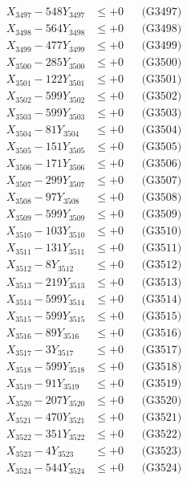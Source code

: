 \documentclass[a4paper,10pt]{article}
\begin{document}
{\begin{align}
X_{3497} - 548Y_{3497} &\leq +0 && \text{(G3497)} \\
X_{3498} - 564Y_{3498} &\leq +0 && \text{(G3498)} \\
X_{3499} - 477Y_{3499} &\leq +0 && \text{(G3499)} \\
X_{3500} - 285Y_{3500} &\leq +0 && \text{(G3500)} \\
\allowbreak
X_{3501} - 122Y_{3501} &\leq +0 && \text{(G3501)} \\
X_{3502} - 599Y_{3502} &\leq +0 && \text{(G3502)} \\
X_{3503} - 599Y_{3503} &\leq +0 && \text{(G3503)} \\
X_{3504} - 81Y_{3504} &\leq +0 && \text{(G3504)} \\
X_{3505} - 151Y_{3505} &\leq +0 && \text{(G3505)} \\
X_{3506} - 171Y_{3506} &\leq +0 && \text{(G3506)} \\
X_{3507} - 299Y_{3507} &\leq +0 && \text{(G3507)} \\
X_{3508} - 97Y_{3508} &\leq +0 && \text{(G3508)} \\
X_{3509} - 599Y_{3509} &\leq +0 && \text{(G3509)} \\
X_{3510} - 103Y_{3510} &\leq +0 && \text{(G3510)} \\
\allowbreak
X_{3511} - 131Y_{3511} &\leq +0 && \text{(G3511)} \\
X_{3512} - 8Y_{3512} &\leq +0 && \text{(G3512)} \\
X_{3513} - 219Y_{3513} &\leq +0 && \text{(G3513)} \\
X_{3514} - 599Y_{3514} &\leq +0 && \text{(G3514)} \\
X_{3515} - 599Y_{3515} &\leq +0 && \text{(G3515)} \\
X_{3516} - 89Y_{3516} &\leq +0 && \text{(G3516)} \\
X_{3517} - 3Y_{3517} &\leq +0 && \text{(G3517)} \\
X_{3518} - 599Y_{3518} &\leq +0 && \text{(G3518)} \\
X_{3519} - 91Y_{3519} &\leq +0 && \text{(G3519)} \\
X_{3520} - 207Y_{3520} &\leq +0 && \text{(G3520)} \\
\allowbreak
X_{3521} - 470Y_{3521} &\leq +0 && \text{(G3521)} \\
X_{3522} - 351Y_{3522} &\leq +0 && \text{(G3522)} \\
X_{3523} - 4Y_{3523} &\leq +0 && \text{(G3523)} \\
X_{3524} - 544Y_{3524} &\leq +0 && \text{(G3524)} \\

\end{align}}
\end{document}
